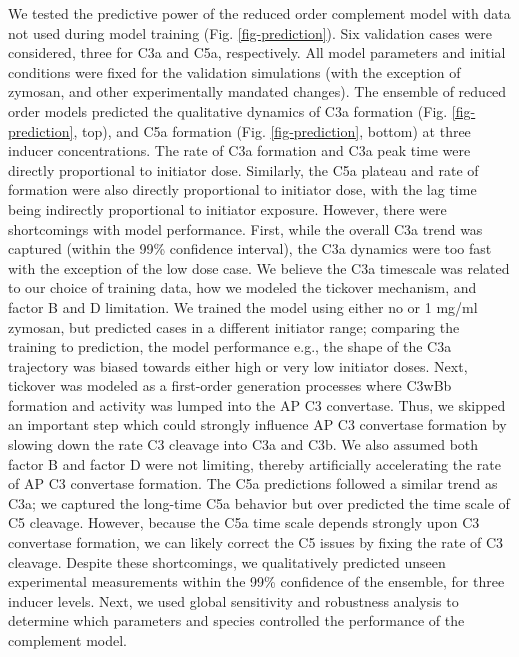 \documentclass[12pt]{article}
\begin{document}
We tested the predictive power of the reduced order complement model with data not used during model training (Fig. \ref{fig-prediction}).
Six validation cases were considered, three for C3a and C5a, respectively.
All model parameters and initial conditions were fixed for the validation simulations (with the exception of zymosan, and other experimentally mandated changes).
The ensemble of reduced order models predicted the qualitative dynamics of C3a formation (Fig. \ref{fig-prediction}, top),
and C5a formation (Fig. \ref{fig-prediction}, bottom) at three inducer concentrations.
The rate of C3a formation and C3a peak time were directly proportional to initiator dose.
Similarly, the C5a plateau and rate of formation were also directly proportional to initiator dose, with the lag time being indirectly proportional to initiator exposure.
However, there were shortcomings with model performance.
First, while the overall C3a trend was captured (within the 99\% confidence interval), the C3a dynamics were too fast with the exception of the low dose case.
We believe the C3a timescale was related to our choice of training data, how we modeled the tickover mechanism, and factor B and D limitation.
We trained the model using either no or 1 mg/ml zymosan, but predicted cases in a different initiator range;
comparing the training to prediction, the model performance e.g., the shape of the C3a trajectory was biased towards either high or very low initiator doses.
Next, tickover was modeled as a first-order generation processes where C3wBb formation and activity was lumped into the AP C3 convertase.
Thus, we skipped an important step which could strongly influence AP C3 convertase formation by slowing down the rate C3 cleavage into C3a and C3b.
We also assumed both factor B and factor D were not limiting, thereby artificially accelerating the rate of AP C3 convertase formation.
The C5a predictions followed a similar trend as C3a; we captured the long-time C5a behavior but over predicted the time scale of C5 cleavage.
However, because the C5a time scale depends strongly upon C3 convertase formation, we can likely correct the C5 issues by fixing the rate of C3 cleavage.
Despite these shortcomings, we qualitatively predicted unseen experimental measurements within the 99\% confidence of the ensemble, for three inducer levels.
Next, we used global sensitivity and robustness analysis to determine which parameters and species controlled the performance of the complement model.

%
\end{document}
